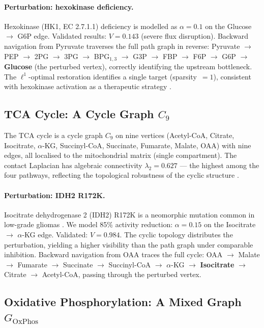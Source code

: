 \documentclass[11pt,twocolumn]{article}
\theoremstyle{plain}
\theoremstyle{definition}
\begin{document}
\paragraph{Perturbation: hexokinase deficiency.}
Hexokinase (HK1, EC 2.7.1.1) deficiency is modelled as $\alpha = 0.1$ on the
Glucose $\to$ G6P edge. Validated results:
$V = 0.143$ (severe flux disruption). Backward navigation from Pyruvate
traverses the full path graph in reverse: Pyruvate $\to$ PEP $\to$ 2PG $\to$
3PG $\to$ BPG$_{1,3}$ $\to$ G3P $\to$ FBP $\to$ F6P $\to$ G6P $\to$
\textbf{Glucose} (the perturbed vertex), correctly identifying the upstream
bottleneck. The $\ell^1$-optimal restoration identifies a single target
(sparsity~$= 1$), consistent with hexokinase activation as a therapeutic
strategy \cite{csermely2013structure}.

\subsection{TCA Cycle: A Cycle Graph $C_9$}

The TCA cycle is a cycle graph $C_9$ on nine vertices (Acetyl-CoA, Citrate,
Isocitrate, $\alpha$-KG, Succinyl-CoA, Succinate, Fumarate, Malate, OAA) with
nine edges, all localised to the mitochondrial matrix (single compartment).
The contact Laplacian has algebraic connectivity $\lambda_2 = 0.627$ --- the
highest among the four pathways, reflecting the topological robustness of the
cyclic structure \cite{kitano2004biological}.

\paragraph{Perturbation: IDH2 R172K.}
Isocitrate dehydrogenase 2 (IDH2) R172K is a neomorphic mutation common in
low-grade gliomas \cite{csermely2013structure}. We model 85\% activity
reduction: $\alpha = 0.15$ on the Isocitrate $\to$ $\alpha$-KG edge.
Validated: $V = 0.984$. The cyclic topology distributes the perturbation,
yielding a higher visibility than the path graph under comparable inhibition.
Backward navigation from OAA traces the full cycle: OAA $\to$ Malate $\to$
Fumarate $\to$ Succinate $\to$ Succinyl-CoA $\to$ $\alpha$-KG $\to$
\textbf{Isocitrate} $\to$ Citrate $\to$ Acetyl-CoA, passing through the
perturbed vertex.

\subsection{Oxidative Phosphorylation: A Mixed Graph $G_{\text{OxPhos}}$}
\end{document}
